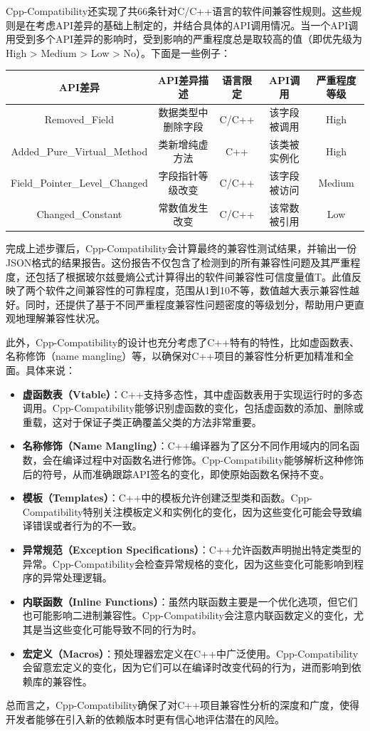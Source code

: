 \documentclass{article}
\begin{document}
Cpp-Compatibility还实现了共66条针对C/C++语言的软件间兼容性规则。这些规则是在考虑API差异的基础上制定的，并结合具体的API调用情况。当一个API调用受到多个API差异的影响时，受到影响的严重程度总是取较高的值（即优先级为 High > Medium > Low > No）。下面是一些例子：

\begin{center}
	\begin{tabular}{|c|c|c|c|c|}
		\hline
		\textbf{API差异} & \textbf{API差异描述} & \textbf{语言限定} & \textbf{API调用} & \textbf{严重程度等级} \\
		\hline
		Removed\_Field & 数据类型中删除字段 & C/C++ & 该字段被调用 & High \\
		\hline
		Added\_Pure\_Virtual\_Method & 类新增纯虚方法 & C++ & 该类被实例化 & High \\
		\hline
		Field\_Pointer\_Level\_Changed & 字段指针等级改变 & C/C++ & 该字段被访问 & Medium \\
		\hline
		Changed\_Constant & 常数值发生改变 & C/C++ & 该常数被引用 & Low \\
		\hline
	\end{tabular}
\end{center}

完成上述步骤后，Cpp-Compatibility会计算最终的兼容性测试结果，并输出一份JSON格式的结果报告。这份报告不仅包含了检测到的所有兼容性问题及其严重程度，还包括了根据玻尔兹曼熵公式计算得出的软件间兼容性可信度量值T。此值反映了两个软件之间兼容性的可靠程度，范围从1到10不等，数值越大表示兼容性越好。同时，还提供了基于不同严重程度兼容性问题密度的等级划分，帮助用户更直观地理解兼容性状况。

此外，Cpp-Compatibility的设计也充分考虑了C++特有的特性，比如虚函数表、名称修饰（name mangling）等，以确保对C++项目的兼容性分析更加精准和全面。具体来说：

\begin{itemize}
	\item \textbf{虚函数表（Vtable）}：C++支持多态性，其中虚函数表用于实现运行时的多态调用。Cpp-Compatibility能够识别虚函数的变化，包括虚函数的添加、删除或重载，这对于保证子类正确覆盖父类的方法非常重要。
	\item \textbf{名称修饰（Name Mangling）}：C++编译器为了区分不同作用域内的同名函数，会在编译过程中对函数名进行修饰。Cpp-Compatibility能够解析这种修饰后的符号，从而准确跟踪API签名的变化，即使原始函数名保持不变。
	\item \textbf{模板（Templates）}：C++中的模板允许创建泛型类和函数。Cpp-Compatibility特别关注模板定义和实例化的变化，因为这些变化可能会导致编译错误或者行为的不一致。
	\item \textbf{异常规范（Exception Specifications）}：C++允许函数声明抛出特定类型的异常。Cpp-Compatibility会检查异常规格的变化，因为这些变化可能影响到程序的异常处理逻辑。
	\item \textbf{内联函数（Inline Functions）}：虽然内联函数主要是一个优化选项，但它们也可能影响二进制兼容性。Cpp-Compatibility会注意内联函数定义的变化，尤其是当这些变化可能导致不同的行为时。
	\item \textbf{宏定义（Macros）}：预处理器宏定义在C++中广泛使用。Cpp-Compatibility会留意宏定义的变化，因为它们可以在编译时改变代码的行为，进而影响到依赖库的兼容性。
\end{itemize}

总而言之，Cpp-Compatibility确保了对C++项目兼容性分析的深度和广度，使得开发者能够在引入新的依赖版本时更有信心地评估潜在的风险。
\end{document}
